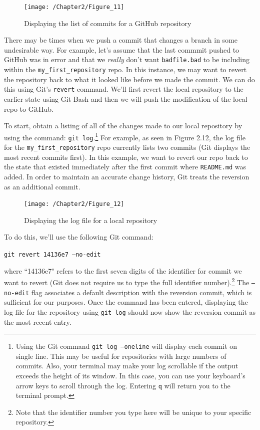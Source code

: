 \documentclass{book}
\begin{document}
\begin{figure}[h]
	\caption{Displaying the list of commits for a GitHub repository}
	\centering\texttt{[image: /Chapter2/Figure\_11]}
\end{figure}

There may be times when we push a commit that changes a branch in some undesirable way. For example, let's assume that the last commmit pushed to GitHub was in error and that we \textit{really} don't want \texttt{badfile.bad} to be including within the \texttt{my\_first\_repository} repo. In this instance, we may want to revert the repository back to what it looked like before we made the commit. We can do this using Git's \texttt{revert} command. We'll first revert the local repository to the earlier state using Git Bash and then we will push the modification of the local repo to GitHub.

To start, obtain a listing of all of the changes made to our local repository by using the command: \texttt{git log}.\footnote{Using the Git command \texttt{git log --oneline} will display each commit on single line. This may be useful for repositories with large numbers of commits. Also, your terminal may make your log scrollable if the output exceeds the height of its window. In this case, you can use your keyboard's arrow keys to scroll through the log. Entering \texttt{q} will return you to the terminal prompt.} For example, as seen in Figure 2.12, the log file for the  \texttt{my\_first\_repository} repo currently lists two commits (Git displays the most recent commits first). In this example, we want to revert our repo back to the state that existed immediately after the first commit where \texttt{README.md} was added. In order to maintain an accurate change history, Git treats the reversion as an additional commit.

\begin{figure}[h]
	\caption{Displaying the log file for a local repository}
	\centering\texttt{[image: /Chapter2/Figure\_12]}
\end{figure}
 
 To do this, we'll use the following Git command:
 
 \texttt {git revert 14136e7 --no-edit}
 
 where ``14136e7" refers to the first seven digits of the identifier for commit we want to revert (Git does not require us to type the full identifier number).\footnote{Note that the identifier number you type here will be unique to your specific repository.} The \texttt{--no-edit} flag associates a default description with the reversion commit, which is sufficient for our purposes. Once the command has been entered, displaying the log file for the repository using \texttt{git log} should now show the reversion commit as the most recent entry.
 
\end{document}
